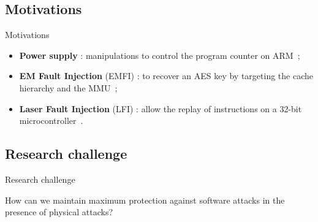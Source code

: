 \subsection{Motivations}
\begin{frame}{Motivations}
    \begin{block}{}
        \begin{itemize}
            \item \textbf{Power supply} : manipulations to control the program counter on ARM~\cite{TSW-16-fdtc};
            \item \textbf{EM Fault Injection} (EMFI) : to recover an AES key by targeting the cache hierarchy and the MMU~\cite{TBELB-21-jce};
            \item \textbf{Laser Fault Injection} (LFI) : allow the replay of instructions on a 32-bit microcontroller~\cite{KDD-21-dsd}.
        \end{itemize}
    \end{block}

    

\end{frame}
\subsection{Research challenge}
\begin{frame}{Research challenge}
    \begin{exampleblock}{}
        \centering
        \Large How can we maintain maximum protection against software attacks in the presence of physical attacks?
    \end{exampleblock}
\end{frame}
